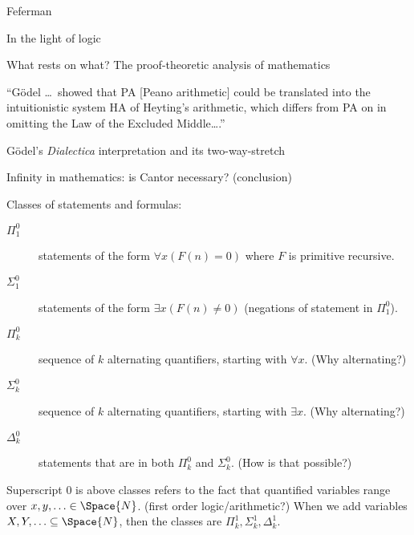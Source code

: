 \begin{plSection}{Feferman}
\begin{plSection}{In the light of logic}
\begin{plSection}{What rests on what? The proof-theoretic analysis of mathematics}

``G\"{o}del \ldots\ showed that PA [Peano arithmetic]
could be translated into the intuitionistic system HA of
Heyting's arithmetic,
which differs from PA on in omitting the 
Law of the Excluded Middle{\ldots}.''~\cite[190]{Feferman:1998:LightOfLogic}

\end{plSection}%
\begin{plSection}{G\"{o}del's \textit{Dialectica} interpretation and its two-way-stretch}
\label{sec:Godels_Dialectica_interpretation}


\end{plSection}%
\begin{plSection}{Infinity in mathematics: is Cantor necessary? (conclusion)}
\label{sec:Cantor_necessary_conclusion}


Classes of statements and formulas:
\begin{description}
\item[$\Pi^0_1$] statements of the form
$\forall x (F(n) = 0)$ where $F$ is primitive recursive.
\item[$\Sigma^0_1$] statements of the form
$\exists x (F(n) \neq 0)$ (negations of statement in $\Pi^0_1$).
\item[$\Pi^0_k$] sequence of $k$ alternating quantifiers,
starting with $\forall x$.
\textmd{(Why alternating?)}
\item[$\Sigma^0_k$] sequence of $k$ alternating quantifiers,
starting with $\exists x$.
\textmd{(Why alternating?)}
\item[$\Delta^0_k$] statements that are in both $\Pi^0_k$
and $\Sigma^0_k$. 
\textmd{(How is that possible?)}
\end{description}
Superscript $0$ is above classes refers to the fact that
quantified variables range over $x,y,\ldots \in \Space{N}$.
\textmd{(first order logic/arithmetic?)}
When we add variables $X,Y,\ldots \subseteq \Space{N}$,
then the classes are $\Pi^1_k, \Sigma^1_k, \Delta^1_k$.


\end{plSection}
\end{plSection}
\end{plSection}
